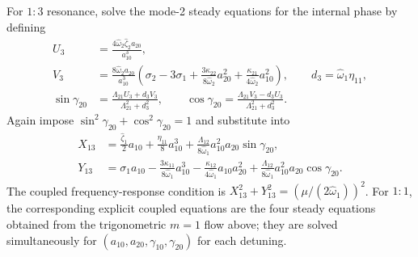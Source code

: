 \documentclass[11pt]{article}
\begin{document}
For $1{:}3$ resonance, solve the mode-2 steady equations for the internal phase by defining
\begin{align*}
U_3&=\frac{4\hat{\omega}_2\hat{\zeta}_2a_{20}}{a_{10}^3},\\
V_3&=\frac{8\hat{\omega}_2a_{20}}{a_{10}^3}\left(\sigma_2-3\sigma_1+\frac{3\kappa_{22}}{8\hat{\omega}_2}a_{20}^2+\frac{\kappa_{21}}{4\hat{\omega}_2}a_{10}^2\right),\qquad d_3=\hat{\omega}_1\eta_{11},\\
\sin\gamma_{20}&=\frac{\Lambda_{21}U_3+d_3V_3}{\Lambda_{21}^2+d_3^2},\qquad
\cos\gamma_{20}=\frac{\Lambda_{21}V_3-d_3U_3}{\Lambda_{21}^2+d_3^2}.
\end{align*}
Again impose $\sin^2\gamma_{20}+\cos^2\gamma_{20}=1$ and substitute into
\begin{align*}
X_{13}&=\frac{\hat{\zeta}_1}{2}a_{10}+\frac{\eta_{11}}{8}a_{10}^3+\frac{\Lambda_{12}}{8\hat{\omega}_1}a_{10}^2a_{20}\sin\gamma_{20},\\
Y_{13}&=\sigma_1a_{10}-\frac{3\kappa_{11}}{8\hat{\omega}_1}a_{10}^3-\frac{\kappa_{12}}{4\hat{\omega}_1}a_{10}a_{20}^2+\frac{\Lambda_{12}}{8\hat{\omega}_1}a_{10}^2a_{20}\cos\gamma_{20}.
\end{align*}
The coupled frequency-response condition is $X_{13}^2+Y_{13}^2=(\mu/(2\hat{\omega}_1))^2$. For $1{:}1$, the corresponding explicit coupled equations are the four steady equations obtained from the trigonometric $m=1$ flow above; they are solved simultaneously for $(a_{10},a_{20},\gamma_{10},\gamma_{20})$ for each detuning.
\end{document}

